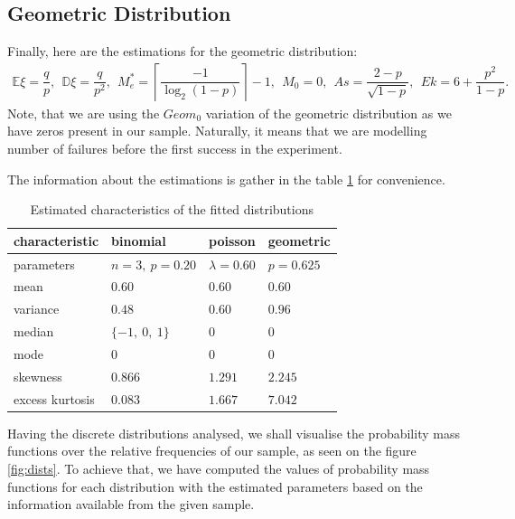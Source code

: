 \documentclass[final,3p,times,onecolumn]{elsarticle}
\begin{document}
\subsection{Geometric Distribution}
Finally, here are the estimations for the geometric distribution:
\begin{gather*}
\mathbb{E}\xi = \dfrac{q}{p}, \ \ 
\mathbb{D}\xi = \dfrac{q}{p^2}, \ \ 
M_e^* = \left\lceil \dfrac{-1}{\log_2(1-p)}\right\rceil - 1, \ \ 
M_0 = 0, \ \ 
As = \dfrac{2 - p}{\sqrt{1 - p}}, \ \ 
Ek = 6 + \dfrac{p^2}{1 - p}.
\end{gather*}
Note, that we are using the $Geom_0$ variation of the geometric distribution as we have zeros present in our sample. 
Naturally, it means that we are modelling number of failures before the first success in the experiment.

The information about the estimations is gather in the table \ref{tab:approx} for convenience. 
\begin{table}[ht]
\centering
\setlength{\tabcolsep}{10pt}
\renewcommand{\arraystretch}{1.25}
\caption{Estimated characteristics of the fitted distributions}
\label{tab:approx}
\begin{tabular}{llll}
\toprule
characteristic & binomial & poisson & geometric \\
\midrule
parameters 
& $n=3,\ p=0.20$
& $\lambda=0.60$
& $p=0.625$ \\

mean 
& $0.60$
& $0.60$
& $0.60$ \\

variance 
& $0.48$
& $0.60$
& $0.96$ \\

median 
& $\{-1,\ 0,\ 1\}$
& $0$
& $0$ \\

mode 
& $0$
& $0$
& $0$ \\

skewness 
& $0.866$
& $1.291$
& $2.245$ \\

excess kurtosis 
& $0.083$
& $1.667$
& $7.042$ \\
\bottomrule
\end{tabular}
\end{table}

Having the discrete distributions analysed, we shall visualise the 
probability mass functions over the relative frequencies of our sample, as seen on the figure \ref{fig:dists}. 
To achieve that, we have computed the values of probability mass functions for each distribution with the estimated parameters based on the information available from the given sample.
\end{document}
